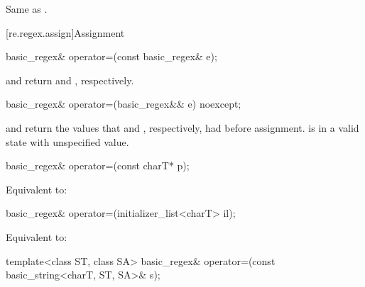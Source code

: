 \begin{itemdescr}
\pnum
\effects
Same as .
\end{itemdescr}

[re.regex.assign]{Assignment}

%
\begin{itemdecl}
basic_regex& operator=(const basic_regex& e);
\end{itemdecl}

\begin{itemdescr}
\pnum
\ensures
{} and  return
 and , respectively.
\end{itemdescr}

%
\begin{itemdecl}
basic_regex& operator=(basic_regex&& e) noexcept;
\end{itemdecl}

\begin{itemdescr}
\pnum
\ensures
{} and  return the values that
 and , respectively, had before assignment.
 is in a valid state with unspecified value.
\end{itemdescr}

%
\begin{itemdecl}
basic_regex& operator=(const charT* p);
\end{itemdecl}

\begin{itemdescr}
\pnum
\effects
Equivalent to: 
\end{itemdescr}

%
\begin{itemdecl}
basic_regex& operator=(initializer_list<charT> il);
\end{itemdecl}

\begin{itemdescr}
\pnum
\effects
Equivalent to: 
\end{itemdescr}

%
\begin{itemdecl}
template<class ST, class SA>
  basic_regex& operator=(const basic_string<charT, ST, SA>& s);
\end{itemdecl}

